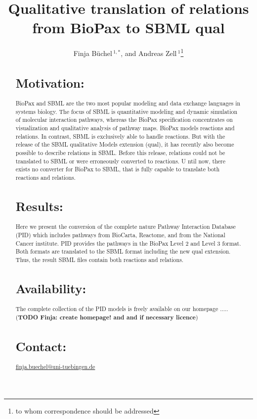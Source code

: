\documentclass{bioinfo}
\begin{document}

\title[BioPax to SBML qual]{Qualitative translation of relations from BioPax to SBML qual}
\author[B\"uchel \textit{et~al}]{Finja B\"uchel\,$^{1,*}$,
and Andreas Zell\,$^1$\footnote{to whom correspondence should be addressed}}
\address{$^{1}$Department of Cognitive Systems, University of Tuebingen, Sand 1, 72076 T\"ubingen, Germany\\}




\maketitle

\begin{abstract}

\section{Motivation:}
BioPax and SBML are the two most popular modeling and data exchange languages in systems biology. 
The focus of SBML is quantitative modeling and dynamic simulation of molecular interaction pathways, whereas the BioPax specification concentrates on visualization and qualitative analysis of pathway maps. 
BioPax models reactions and relations. In contrast, SBML is exclusively able to handle reactions. 
But with the release of the SBML qualitative Models extension (qual), it has recently also become possible to describe relations in SBML. 
Before this release, relations could not be translated to SBML or were erroneously converted to reactions. U
ntil now, there exists no converter for BioPax to SBML, that is fully capable to translate both reactions and relations.
\section{Results:}
Here we present the conversion of the complete nature Pathway Interaction Database (PID) which includes pathways from BioCarta, Reactome, and from the National Cancer institute. 
PID provides the pathways in the BioPax Level 2 and Level 3 format. 
Both formats are translated to the SBML format including the new qual extension. 
Thus, the result SBML files contain both reactions and relations.
\section{Availability:}
The complete collection of the PID models is freely available on our homepage ..... (\textbf{TODO Finja: create homepage! and and if necessary licence})
\section{Contact:} \href{finja.buechel@uni-tuebingen.de}{finja.buechel@uni-tuebingen.de}
\end{abstract}
\end{document}
